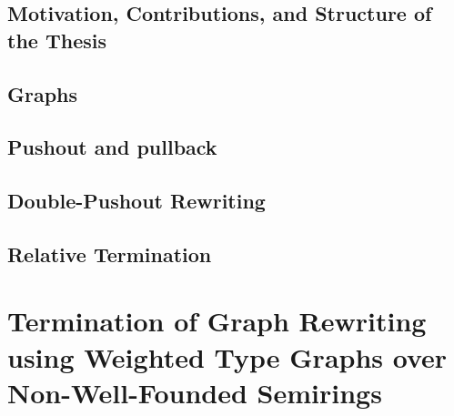 \documentclass{report}
\begin{document}
\section{Motivation, Contributions, and Structure of the Thesis} 

\section{Graphs}
 
\section{Pushout and pullback}  

\section{Double-Pushout Rewriting}
 
\section{Relative Termination}



\chapter{Termination of Graph Rewriting
using Weighted Type Graphs
over Non-Well-Founded Semirings} 
\label{chap:nwf_type_graph}


\end{document}
